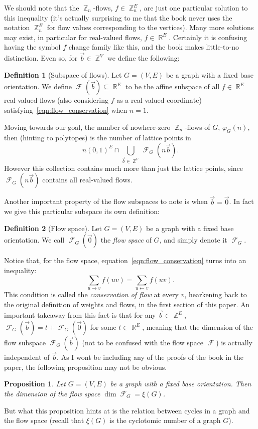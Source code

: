 \documentclass{amsart}
\DeclareMathOperator{\Z}{\mathbb{Z}}
\DeclareMathOperator{\R}{\mathbb{R}}
\DeclareMathOperator{\calF}{\mathcal{F}}
\theoremstyle{plain}
\newtheorem{prop*}{Proposition}
\theoremstyle{remark}
\theoremstyle{definition}
\newtheorem*{definition*}{Definition}
\newenvironment{prop}%
  {\begin{leftbar}\begin{prop*}
}{%
  \end{prop*}\end{leftbar}
}
\newenvironment{definition}%
  {\begin{leftbar}\begin{definition*}
}{%
  \end{definition*}\end{leftbar}
}
\begin{document}
We should note that the $\Z_n$-flows, $f\in\Z_n^E$, are just one particular
solution to this inequality (it's actually surprising to me that the book never
uses the notation $\Z_n^E$ for flow values corresponding to the vertices). Many
more solutions may exist, in particular for real-valued flows, $f\in\R^E$.
Certainly it is confusing having the symbol $f$ change family like this, and the
book makes little-to-no distinction.
%
Even so, for $\vec b\in\Z^V$ we define the following:
\begin{definition}[Subspace of flows]
  Let $G=(V,E)$ be a graph with a fixed base orientation.
  We define $\calF(\vec b)\subseteq\R^E$ to be the
  affine subspace of all $f\in\R^E$ real-valued flows
  (also considering $f$ as a real-valued coordinate)
  satisfying~\eqref{eqn:flow_conservation} when $n=1$.
\end{definition}

Moving towards our goal, the number of nowhere-zero $\Z_n$-flows of $G$,
$\varphi_G(n)$, then (hinting to polytopes) is the number of lattice points in
\[
  n{(0,1)}^E\cap\bigcup_{\vec b\in\Z^V}\calF_G(n\vec b).
\]
However this collection contains much more than just the lattice points,
since $\calF_G(n\vec b)$ contains all real-valued flows.

Another important property of the flow subspaces to note is when
$\vec b=\vec 0$. In fact we give this particular subspace its own definition:
\begin{definition}[Flow space]
  Let $G=(V,E)$ be a graph with a fixed base orientation.
  We call $\calF_G(\vec 0)$ the \emph{flow space} of $G$, and simply
  denote it $\calF_G$.
\end{definition}
Notice that, for the flow space, equation~\eqref{eqn:flow_conservation} turns
into an inequality:
\[
  \sum_{u\rightarrow v}f(uv)=\sum_{u\leftarrow v}f(uv).
\] 
This condition is called the \emph{conservation of flow} at every $v$,
hearkening back to the original definition of weights and flows, in the first
section of this paper.
An important takeaway from this fact is that for any $\vec b\in\Z^E$,
$\calF_G(\vec b)=t+\calF_G(\vec 0)$
for some $t\in\R^E$, meaning that the dimension of the flow subspace
$\calF_G(\vec b)$ (not to be confused with the flow space $\calF$)
is actually independent of $\vec b$.
As I wont be including any of the proofs of the book in the paper, the following
proposition may not be obvious.
\begin{prop}
  Let $G=(V,E)$ be a graph with a fixed base orientation.
  Then the dimension of the flow space $\dim\calF_G=\xi(G)$.
\end{prop}
But what this proposition hints at is the relation between cycles in a graph
and the flow space (recall that $\xi(G)$ is the cyclotomic number of a graph
$G$).
\end{document}
